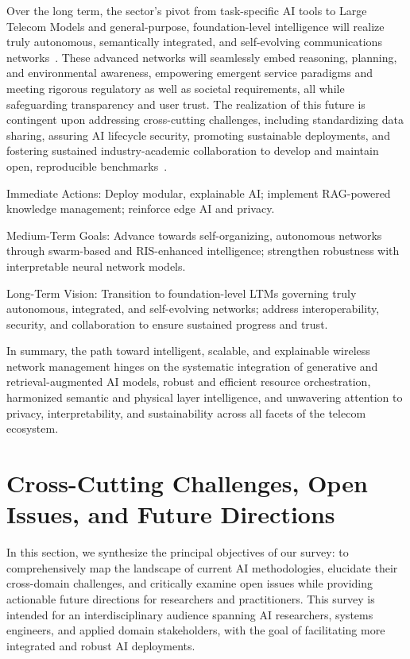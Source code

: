 \documentclass[sigconf]{acmart}
\begin{document}
Over the long term, the sector's pivot from task-specific AI tools to Large Telecom Models and general-purpose, foundation-level intelligence will realize truly autonomous, semantically integrated, and self-evolving communications networks~\cite{ref16, ref20, ref46, ref49}. These advanced networks will seamlessly embed reasoning, planning, and environmental awareness, empowering emergent service paradigms and meeting rigorous regulatory as well as societal requirements, all while safeguarding transparency and user trust. The realization of this future is contingent upon addressing cross-cutting challenges, including standardizing data sharing, assuring AI lifecycle security, promoting sustainable deployments, and fostering sustained industry-academic collaboration to develop and maintain open, reproducible benchmarks~\cite{ref16, ref46, ref49}.

Immediate Actions: Deploy modular, explainable AI; implement RAG-powered knowledge management; reinforce edge AI and privacy.

Medium-Term Goals: Advance towards self-organizing, autonomous networks through swarm-based and RIS-enhanced intelligence; strengthen robustness with interpretable neural network models.

Long-Term Vision: Transition to foundation-level LTMs governing truly autonomous, integrated, and self-evolving networks; address interoperability, security, and collaboration to ensure sustained progress and trust.

In summary, the path toward intelligent, scalable, and explainable wireless network management hinges on the systematic integration of generative and retrieval-augmented AI models, robust and efficient resource orchestration, harmonized semantic and physical layer intelligence, and unwavering attention to privacy, interpretability, and sustainability across all facets of the telecom ecosystem.

\section{Cross-Cutting Challenges, Open Issues, and Future Directions}

In this section, we synthesize the principal objectives of our survey: to comprehensively map the landscape of current AI methodologies, elucidate their cross-domain challenges, and critically examine open issues while providing actionable future directions for researchers and practitioners. This survey is intended for an interdisciplinary audience spanning AI researchers, systems engineers, and applied domain stakeholders, with the goal of facilitating more integrated and robust AI deployments.
\end{document}
